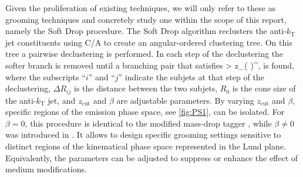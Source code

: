Given the proliferation of existing techniques, we will only refer to these as grooming techniques and concretely study one within the scope of this report, namely the Soft Drop procedure.
The Soft Drop algorithm reclusters the anti-$k_{\mathrm{T}}$ jet constituents using C/A to create an angular-ordered clustering tree. On this tree a pairwise declustering is performed. In each step of the declustering the softer branch is removed until a branching pair that satisfies
\beq
\label{eq:groompar}
 > z_{}\left(  \right)^{\beta},
\eeq
is found, where the subscripts ``$i$'' and ``$j$'' indicate the subjets at that step of the declustering, $\Delta R_{ij}$ is the distance between the two subjets, $R_{0}$ is the cone size of the anti-$k_{\mathrm{T}}$ jet, and $z_{\text{cut}}$ and $\beta$ are adjustable parameters. By varying $z_{\text{cut}}$ and $\beta$, specific regions of the emission phase space, see \autoref{fig:PS1}, can be isolated. For $\beta = 0$, this procedure is identical to the modified mass-drop tagger \cite{Dasgupta:2013ihk}, while $\beta \neq 0$ was introduced in \cite{Larkoski:2014wba}. It allows to design specific grooming settings sensitive to distinct regions of the kinematical phase space represented in the Lund plane. Equivalently, the parameters can be adjusted to suppress or enhance the effect of medium modifications.

